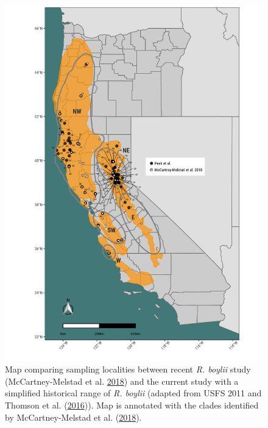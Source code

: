 \documentclass[proquest,12pt,final]{ucthesis-CA2012} %
\begin{document}
\begin{ucmainmatter}
\begin{figure}
\includegraphics[width=0.85\linewidth]{figure/ch3/fig_01_maps_all_rabo_filt10_1_100k_revrange_localities_annotated} \caption{Map comparing sampling localities between recent \emph{R.
boylii} study (McCartney-Melstad et al.
\protect\hyperlink{ref-mccartney-melstad_population_2018}{2018}) and the
current study with a simplified historical range of \emph{R. boylii}
(adapted from USFS 2011 and Thomson et al.
(\protect\hyperlink{ref-thomson_california_2016}{2016})). Map is
annotated with the clades identified by McCartney-Melstad et al.
(\protect\hyperlink{ref-mccartney-melstad_population_2018}{2018}).}\label{fig:CH3F1map}
\end{figure}
\clearpage


\end{ucmainmatter}
\end{document}
